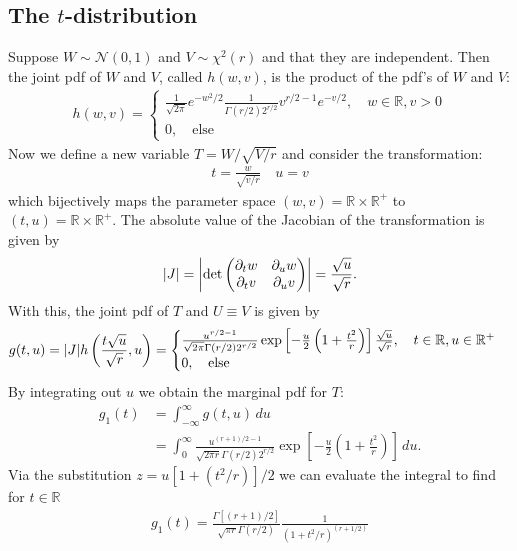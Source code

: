 \documentclass{book}
\theoremstyle{definition}
\newcommand{\p}{\partial}
\newcommand{\R}{\mathbb{R}}
\newcommand{\nn}{\nonumber}
\newcommand{\Else}{\text{else}}
\newcommand{\f}[2]{\frac{#1}{#2}}
\newcommand{\lp}{\left(}
\newcommand{\rp}{\right)}
\newcommand{\lb}{\left[}
\newcommand{\rb}{\right]}
\begin{document}
\subsection{The $t$-distribution}
Suppose $W \sim \mathcal{N}(0,1)$ and $V \sim \chi^2(r)$ and that they are independent. Then the joint pdf of $W$ and $V$, called $h(w,v)$, is the product of the pdf's of $W$ and $V$:
\begin{align}
h(w,v) = \begin{cases}
\f{1}{\sqrt{2\pi}}e^{-w^2/2}\f{1}{\Gamma(r/2)2^{r/2}}v^{r/2-1}e^{-v/2}, \quad w\in \R, v >0\\
0, \quad \Else
\end{cases}
\end{align}
Now we define a new variable $T = W/\sqrt{V/r}$ and consider the transformation:
\begin{align}
t = \f{w}{\sqrt{v/r}} \quad u=v
\end{align}
which bijectively maps the parameter space $(w,v) = \R\times \R^+$ to $(t,u)=\R \times \R^+$. The absolute value of the Jacobian of the transformation is given by
\begin{align}
\abs{J} = \abs{\det\begin{pmatrix}
	\p_tw & \p_u w\\
	\p_tv & \p_u v
	\end{pmatrix}} = \f{\sqrt{u}}{\sqrt{r}}.
\end{align} 
With this, the joint pdf of $T$ and $U \equiv V$ is given by
\begin{align}
g(t,u) =  \abs{J}h\lp \f{t\sqrt{u}}{\sqrt{r}},u \rp
= \begin{cases}
\f{u^{r/2-1}}{\sqrt{2\pi} \Gamma(r/2) 2^{r/2}}\exp\lb -\f{u}{2} \lp 1 + \f{t^2}{r} \rp \rb \f{\sqrt{u}}{\sqrt{r}}, \quad t\in \R, u \in \R^+\\
0,\quad \Else
\end{cases}
\end{align}
By integrating out $u$ we obtain the marginal pdf for $T$:
\begin{align}
g_1(t) &= \int^\infty_{-\infty}g(t,u)\,du \nn\\
&= \int^\infty_0 \f{u^{(r+1)/2-1}}{\sqrt{2\pi r} \Gamma(r/2) 2^{r/2}}\exp\lb -\f{u}{2} \lp 1 + \f{t^2}{r} \rp \rb \,du.
\end{align}
Via the substitution $z = u[1 + (t^2/r)]/2$ we can evaluate the integral to find for $t\in \R$
\begin{align}
\boxed{g_1(t) = \f{\Gamma[(r+1)/2]}{\sqrt{\pi r}\Gamma(r/2)}  \f{1}{(1 + t^2/r)^{(r+1/2)}} }
\end{align}
\end{document}
